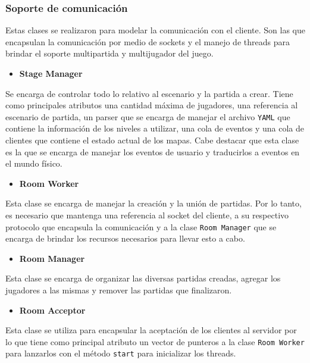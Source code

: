 \documentclass[a4paper]{article}
\begin{document}
\subsubsection{Soporte de comunicación}

Estas clases se realizaron para modelar la comunicación con el cliente. Son las que encapsulan la comunicación por medio de sockets y el manejo de threads para brindar el soporte multipartida y multijugador del juego.

\begin{itemize}
	\item \textbf{Stage Manager}
\end{itemize}

Se encarga de controlar todo lo relativo al escenario y la partida a crear. Tiene como principales atributos una cantidad máxima de jugadores, una referencia al escenario de partida, un parser que se encarga de manejar el archivo \texttt{YAML} que contiene la información de los niveles a utilizar, una cola de eventos y una cola de clientes que contiene el estado actual de los mapas.  Cabe destacar que esta clase es la que se encarga de manejar los eventos de usuario y traducirlos a eventos en el mundo físico.

\begin{itemize}
	\item \textbf{Room Worker}
\end{itemize}

Esta clase se encarga de manejar la creación y la unión de partidas. Por lo tanto, es necesario que mantenga una referencia al socket del cliente, a su respectivo protocolo que encapsula la comunicación y a la clase \texttt{Room Manager} que se encarga de brindar los recursos necesarios para llevar esto a cabo.

\begin{itemize}
	\item \textbf{Room Manager}
\end{itemize}

Esta clase se encarga de organizar las diversas partidas creadas, agregar los jugadores a las mismas y remover las partidas que finalizaron.

\begin{itemize}
	\item \textbf{Room Acceptor}
\end{itemize}

Esta clase se utiliza para encapsular la aceptación de los clientes al servidor por lo que tiene como principal atributo un vector de punteros a la clase \texttt{Room Worker} para lanzarlos con el método \texttt{start} para inicializar los threads.
\end{document}
